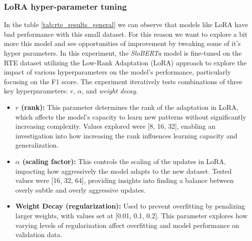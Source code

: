 \documentclass[fleqn,moreauthors,10pt]{ds_report}
\begin{document}
\subsubsection{LoRA hyper-parameter tuning} 
In the table \ref{tab:rte_results_general} we can observe that models like LoRA have bad performance with this small dataset. For this reason we want to explore a bit more this model and see opportunities of improvement by tweaking some of it's hyper parameters. In this experiment, the \textit{SloBERTa} model is fine-tuned on the RTE dataset utilizing the Low-Rank Adaptation (LoRA) approach to explore the impact of various hyperparameters on the model's performance, particularly focusing on the F1 score. The experiment iteratively tests combinations of three key hyperparameters: \( r \), \( \alpha \), and \textit{weight decay}.

\begin{itemize}
    \item \textbf{\( r \) (rank):} This parameter determines the rank of the adaptation in LoRA\cite{hu2022lora}, which affects the model's capacity to learn new patterns without significantly increasing complexity. Values explored were [8, 16, 32], enabling an investigation into how increasing the rank influences learning capacity and generalization.
    \item \textbf{\( \alpha \) (scaling factor):} This controls the scaling of the updates in LoRA\cite{hu2022lora}, impacting how aggressively the model adapts to the new dataset. Tested values were [16, 32, 64], providing insights into finding a balance between overly subtle and overly aggressive updates.
    \item \textbf{Weight Decay (regularization):} Used to prevent overfitting by penalizing larger weights, with values set at [0.01, 0.1, 0.2]. This parameter explores how varying levels of regularization affect overfitting and model performance on validation data.
\end{itemize}
\end{document}
